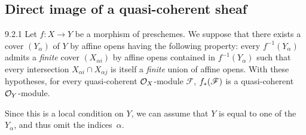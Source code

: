 \documentclass[../main.tex]{subfiles}
\begin{document}
\subsection{Direct image of a quasi-coherent sheaf}

\begin{cx}[Proposition]{9.2.1}
    Let $f\colon X\to Y$ be a morphism of preschemes.
    We suppose that there exists a cover $(Y_\alpha)$ of $Y$ by affine opens having the following property: every $f^{-1}(Y_\alpha)$ admits a \emph{finite} cover $(X_{\alpha i})$ by affine opens contained in $f^{-1}(Y_\alpha)$ such that every intersection $X_{\alpha i}\cap X_{\alpha j}$ is itself a \emph{finite} union of affine opens.
    With these hypotheses, for every quasi-coherent $\mathcal{O}_X$-module $\mathscr{F}$, $f_*(\mathscr{F})$ is a quasi-coherent $\mathcal{O}_Y$-module.
\end{cx}

Since this is a local condition on $Y$, we can assume that $Y$ is equal to one of the $Y_\alpha$, and thus omit the indices~$\alpha$.
\end{document}
